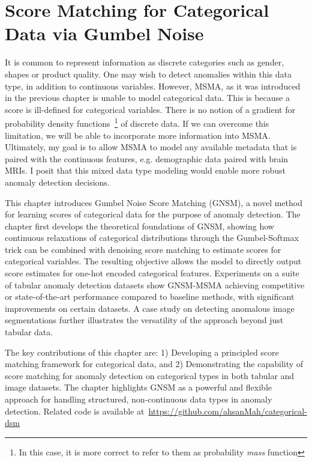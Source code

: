 \chapter{Score Matching for Categorical Data via Gumbel Noise }
\label{ch:gnsm}

It is common to represent information as discrete categories such as gender, shapes or product quality.
One may wish to detect anomalies within this data type, in addition to continuous variables. However, MSMA, as it was introduced in the previous chapter is unable to model categorical data.
This is because a score is ill-defined for categorical variables. There is no notion of a gradient for probability density functions~\footnote{In this case, it is more correct to refer to them as probability \textit{mass} function} of discrete data. If we can overcome this limitation, we will be able to incorporate more information into MSMA. Ultimately, my goal is to allow MSMA to model any available metadata that is paired with the continuous features, e.g. demographic data paired with brain MRIs. I posit that this mixed data type modeling would enable more robust anomaly detection decisions.

This chapter introduces Gumbel Noise Score Matching (GNSM), a novel method for learning scores of categorical data for the purpose of anomaly detection.
The chapter first develops the theoretical foundations of GNSM, showing how continuous relaxations of categorical distributions through the Gumbel-Softmax trick can be combined with denoising score matching to estimate scores for categorical variables. The resulting objective allows the model to directly output score estimates for one-hot encoded categorical features. Experiments on a suite of tabular anomaly detection datasets show GNSM-MSMA achieving competitive or state-of-the-art performance compared to baseline methods, with significant improvements on certain datasets. A case study on detecting anomalous image segmentations further illustrates the versatility of the approach beyond just tabular data.

The key contributions of this chapter are: 1) Developing a principled score matching framework for categorical data, and 2) Demonstrating the capability of score matching for anomaly detection on categorical types in both tabular and image datasets. The chapter highlights GNSM as a powerful and flexible approach for handling structured, non-continuous data types in anomaly detection. Related code is available at~\url{https://github.com/ahsanMah/categorical-dsm}

